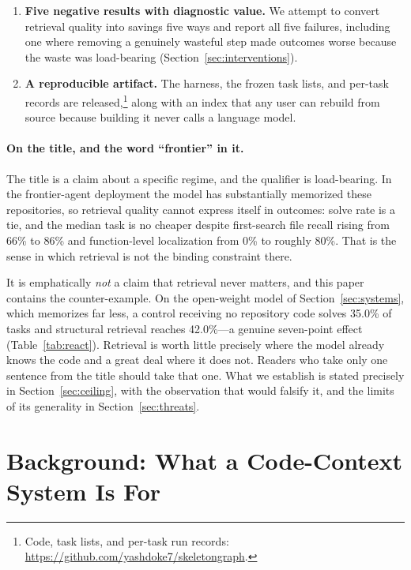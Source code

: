 \documentclass[11pt,letterpaper]{article}
\begin{document}
\begin{enumerate}
\item \textbf{Five negative results with diagnostic value.} We attempt to convert
retrieval quality into savings five ways and report all five failures, including
one where removing a genuinely wasteful step made outcomes worse because the
waste was load-bearing (Section~\ref{sec:interventions}).

\item \textbf{A reproducible artifact.} The harness, the frozen task lists, and
per-task records are released,\footnote{Code, task lists, and per-task run records:
\url{https://github.com/yashdoke7/skeletongraph}.} along with an index that any user can rebuild from
source because building it never calls a language model.
\end{enumerate}

\paragraph{On the title, and the word ``frontier'' in it.}
The title is a claim about a specific regime, and the qualifier is load-bearing. In
the frontier-agent deployment the model has substantially memorized these
repositories, so retrieval quality cannot express itself in outcomes: solve rate is a
tie, and the median task is no cheaper despite first-search file recall rising from
66\% to 86\% and function-level localization from 0\% to roughly 80\%. That is the
sense in which retrieval is not the binding constraint there.

It is emphatically \emph{not} a claim that retrieval never matters, and this paper
contains the counter-example. On the open-weight model of Section~\ref{sec:systems},
which memorizes far less, a control receiving no repository code solves 35.0\% of
tasks and structural retrieval reaches 42.0\%---a genuine seven-point effect
(Table~\ref{tab:react}). Retrieval is worth little precisely where the model already
knows the code and a great deal where it does not. Readers who take only one sentence
from the title should take that one. What we establish is stated precisely in
Section~\ref{sec:ceiling}, with the observation that would falsify it, and the limits
of its generality in Section~\ref{sec:threats}.

\section{Background: What a Code-Context System Is For}
\label{sec:background}
\end{document}
